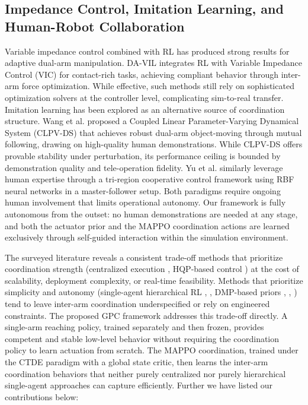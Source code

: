 \documentclass[a4paper,fleqn]{cas-dc}
\begin{document}
\subsection{Impedance Control, Imitation Learning, and Human-Robot Collaboration}
Variable impedance control combined with RL has produced strong results for adaptive dual-arm manipulation.
DA-VIL \cite{related-49} integrates RL with Variable Impedance Control (VIC) for contact-rich tasks, achieving compliant behavior through inter-arm force optimization. While effective, such methods still rely on sophisticated optimization solvers at the controller level, complicating sim-to-real transfer. Imitation learning has been explored as an alternative source of coordination structure. Wang et al. \cite{related-50} proposed a Coupled Linear Parameter-Varying Dynamical System (CLPV-DS) that achieves robust dual-arm object-moving through mutual following, drawing on high-quality human demonstrations. While CLPV-DS offers provable stability under perturbation, its performance ceiling is bounded by demonstration quality and tele-operation fidelity. Yu et al. \cite{related-51} similarly leverage human expertise through a tri-region cooperative control framework using RBF neural networks in a master-follower setup. Both paradigms require ongoing human involvement that limits operational autonomy. Our framework is fully autonomous from the outset: no human demonstrations are needed at any stage, and both the actuator prior and the MAPPO coordination actions are learned exclusively through self-guided interaction within the simulation environment.

The surveyed literature reveals a consistent trade-off methods that prioritize coordination strength (centralized execution \cite{related-43}, HQP-based control \cite{related-48}) at the cost of scalability, deployment complexity, or real-time feasibility. Methods that prioritize simplicity and autonomy (single-agent hierarchical RL \cite{related-38}, \cite{related-37}, DMP-based priors \cite{related-40}, \cite{related-41}, \cite{related-42}) tend to leave inter-arm coordination underspecified or rely on engineered constraints. The proposed GPC framework addresses this trade-off directly. A single-arm reaching policy, trained separately and then frozen, provides competent and stable low-level behavior without requiring the coordination policy to learn actuation from scratch. The MAPPO coordination, trained under the CTDE paradigm with a global state critic, then learns the inter-arm coordination behaviors that neither purely centralized nor purely hierarchical single-agent approaches can capture efficiently. Further we have listed our contributions below:
\end{document}
